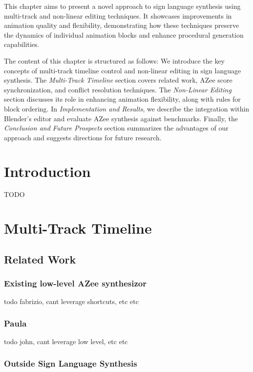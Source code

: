 \documentclass[../../main.tex]{subfiles}
\begin{document}
This chapter aims to present a novel approach to sign language synthesis using multi-track and non-linear editing techniques. It showcases improvements in animation quality and flexibility, demonstrating how these techniques preserve the dynamics of individual animation blocks and enhance procedural generation capabilities.

The content of this chapter is structured as follows: We introduce the key concepts of multi-track timeline control and non-linear editing in sign language synthesis. The \emph{Multi-Track Timeline} section covers related work, AZee score synchronization, and conflict resolution techniques. The \emph{Non-Linear Editing} section discusses its role in enhancing animation flexibility, along with rules for block ordering. In \emph{Implementation and Results}, we describe the integration within Blender’s editor and evaluate AZee synthesis against benchmarks. Finally, the \emph{Conclusion and Future Prospects} section summarizes the advantages of our approach and suggests directions for future research.

\section{Introduction}

TODO


\section{Multi-Track Timeline}

\subsection{Related Work}

\subsubsection{Existing low-level AZee synthesizor}

todo fabrizio, cant leverage shortcuts, etc etc

\subsubsection{Paula}

todo john, cant leverage low level, etc etc

\subsubsection{Outside Sign Language Synthesis}
\end{document}

